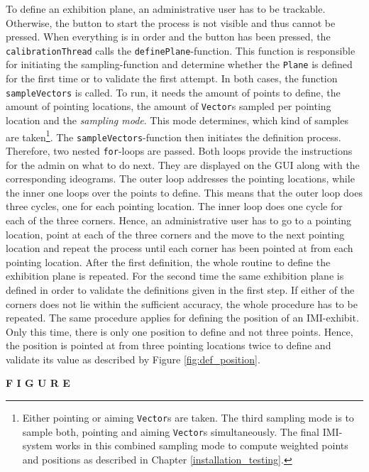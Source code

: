 To define an exhibition plane, an administrative user has to be trackable. Otherwise, the button to start the process is not visible and thus cannot be pressed. When everything is in order and the button has been pressed, the \texttt{calibrationThread} calls the \texttt{definePlane}-function. This function is responsible for initiating the sampling-function and determine whether the \texttt{Plane} is defined for the first time or to validate the first attempt. In both cases, the function \texttt{sampleVectors} is called. To run, it needs the amount of points to define, the amount of pointing locations, the amount of \texttt{Vector}s sampled per pointing location and the \textit{sampling mode}. This mode determines, which kind of samples are taken\footnote{Either pointing or aiming \texttt{Vector}s are taken. The third sampling mode is to sample both, pointing and aiming \texttt{Vector}s simultaneously. The final \ac{IMI}-system works in this combined sampling mode to compute weighted points and positions as described in Chapter \ref{installation_testing}.}. The \texttt{sampleVectors}-function then initiates the definition process. Therefore, two nested \texttt{for}-loops are passed. Both loops provide the instructions for the admin on what to do next. They are displayed on the \ac{GUI} along with the corresponding ideograms. The outer loop addresses the pointing locations, while the inner one loops over the points to define. This means that the outer loop does three cycles, one for each pointing location. The inner loop does one cycle for each of the three corners. Hence, an administrative user has to go to a pointing location, point at each of the three corners and the move to the next pointing location and repeat the process until each corner has been pointed at from each pointing location. After the first definition, the whole routine to define the exhibition plane is repeated. For the second time the same exhibition plane is defined in order to validate the definitions given in the first step. If either of the corners does not lie within the sufficient accuracy, the whole procedure has to be repeated. The same procedure applies for defining the position of an \ac{IMI}-exhibit. Only this time, there is only one position to define and not three points. Hence, the position is pointed at from three pointing locations twice to define and validate its value as described by Figure \ref{fig:def_position}.

\textbf{F I G U R E}

